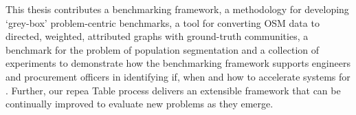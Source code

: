 This thesis contributes a benchmarking framework, a methodology for developing `grey-box' \gai problem-centric benchmarks, a tool for converting \ac{OSM} data to directed, weighted, attributed graphs with ground-truth communities, a benchmark for the \gai problem of population segmentation and a collection of experiments to demonstrate how the \gai benchmarking framework supports engineers and procurement officers in identifying if, when and how to accelerate systems for \gai.
Further, our repea Table process delivers an extensible framework that can be continually improved to evaluate new \gai problems as they emerge.















